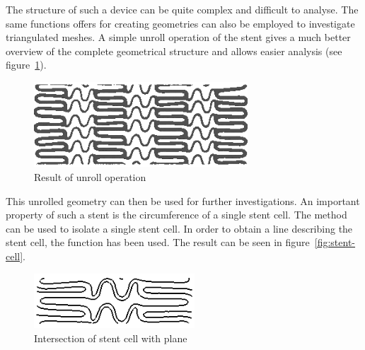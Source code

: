 The structure of such a device can be quite complex and difficult to analyse. The same functions \pyf offers for creating geometries can also be employed to investigate triangulated meshes. A simple unroll operation of the stent gives a much better overview of the complete geometrical structure and allows easier analysis (see figure~\ref{fig:cypher-stent-unroll}).
 

\begin{figure}[h]
  \centering
  \begin{makeimage}
  \end{makeimage}
  \begin{latexonly}
    \includegraphics[width=8cm]{images/cypher-stent-unroll}
  \end{latexonly}
  \begin{htmlonly}
  \end{htmlonly}  
  \caption{Result of unroll operation}
  \label{fig:cypher-stent-unroll}
\end{figure}

This unrolled geometry can then be used for further investigations. An important property of such a stent is the circumference of a single stent cell. The  method can be used to isolate a single stent cell. In order to obtain a line describing the stent cell, the function  has been used. The result can be seen in figure~\ref{fig:stent-cell}.

\begin{figure}[h]
  \centering
  \begin{makeimage}
  \end{makeimage}
  \begin{latexonly}
    \includegraphics[width=6cm]{images/stent-cell-full}
  \end{latexonly}
  \begin{htmlonly}
  \end{htmlonly}  
  \caption{Intersection of stent cell with plane}
  \label{fig:stent-cell-full}
\end{figure}


